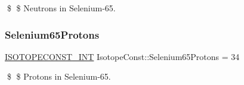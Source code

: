 \$ \$ Neutrons in Selenium-\/65. \mbox{\label{group___isotope_const-_selenium-_se65_ga8cb3932f1a0009826750ab264619116a}} 
\subsubsection{\texorpdfstring{Selenium65\+Protons}{Selenium65Protons}}
{\footnotesize\ttfamily \mbox{\hyperlink{group___isotope_const-_macros_ga5f18360b3e99483a35c32d789e62621c}{I\+S\+O\+T\+O\+P\+E\+C\+O\+N\+S\+T\+\_\+\+I\+NT}} Isotope\+Const\+::\+Selenium65\+Protons = 34}

\$ \$ Protons in Selenium-\/65. 